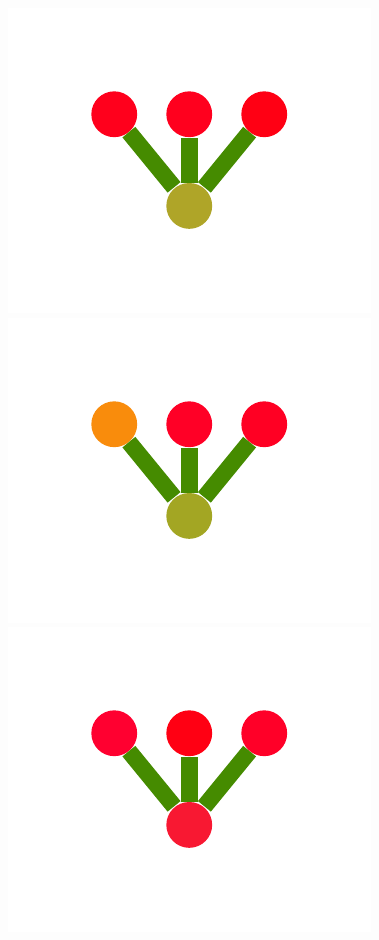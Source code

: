 \documentclass[a4paper,10pt]{article}
\begin{document}
\begin{figure}
{    \includegraphics[scale=.26]{../figures/vector/4-2-1-noisyprog-postB-3.pdf}
    \includegraphics[scale=.26]{../figures/vector/4-2-1-noisyprog-postB-4.pdf}
    \includegraphics[scale=.26]{../figures/vector/4-2-1-noisyprog-postB-5.pdf}
}
\end{figure}
\end{document}

